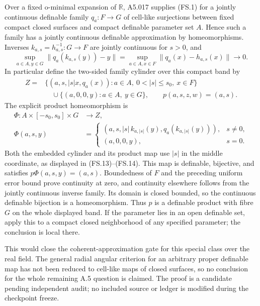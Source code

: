 Over a fixed o-minimal expansion of $\mathbb R$, A5.017 supplies (FS.1) for
a jointly continuous definable family $q_a:F\to G$ of cell-like surjections
between fixed compact closed surfaces and compact definable parameter set
$A$. Hence such a family has a jointly continuous definable approximation
by homeomorphisms. Inverses $k_{a,s}=h_{a,s}^{-1}:G\to F$ are jointly
continuous for $s>0$, and
\[
 \sup_{a\in A,y\in G}\|q_a(k_{a,s}(y))-y\|
 =\sup_{a\in A,x\in F}\|q_a(x)-h_{a,s}(x)\|\longrightarrow0.
\]
In particular define the two-sided family cylinder over this compact band
by
\[
\begin{split}
 Z={}&\{(a,s,|s|x,q_a(x)):a\in A,\ 0<|s|\le s_0,\ x\in F\}\\
 &\quad\cup\{(a,0,0,y):a\in A,\ y\in G\},
 \qquad p(a,s,z,w)=(a,s).
\end{split}
\tag{FS.13}
\]
The explicit product homeomorphism is
\[
\begin{split}
 \Phi:A\times[-s_0,s_0]\times G&\longrightarrow Z,\\
 \Phi(a,s,y)&=
 \begin{cases}
 (a,s,|s|\,k_{a,|s|}(y),q_a(k_{a,|s|}(y))),&s\ne0,\\
 (a,0,0,y),&s=0.
 \end{cases}
\end{split}
\tag{FS.14}
\]
Both the embedded cylinder and its product map use $|s|$ in the middle
coordinate, as displayed in (FS.13)--(FS.14). This map is
definable, bijective, and satisfies $p\Phi(a,s,y)=(a,s)$. Boundedness of
$F$ and the preceding uniform error bound prove continuity at zero, and
continuity elsewhere follows from the jointly continuous inverse family.
Its domain is closed bounded, so the continuous definable bijection is a
homeomorphism. Thus $p$ is a definable product with fibre $G$ on the whole
displayed band. If the parameter lies in an open definable set, apply this
to a compact closed neighborhood of any specified parameter; the conclusion
is local there.

This would close the coherent-approximation gate for this special class
over the real field. The general radial angular criterion for an arbitrary
proper definable map has not been reduced to cell-like maps of closed
surfaces, so no conclusion for the whole remaining A.5 question is claimed.
The proof is a candidate pending independent audit; no included source or
ledger is modified during the checkpoint freeze.

